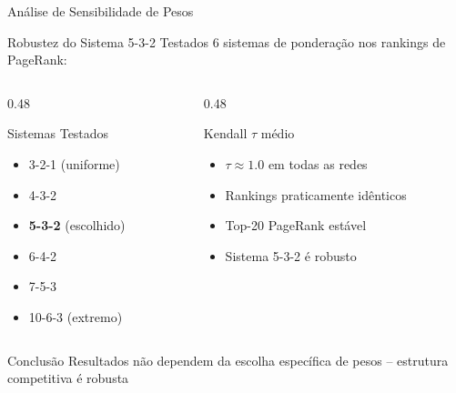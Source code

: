 \begin{frame}[shrink=5]{Análise de Sensibilidade de Pesos}
    \begin{block}{Robustez do Sistema 5-3-2}
        Testados 6 sistemas de ponderação nos rankings de PageRank:
    \end{block}

    \vspace{0.3cm}

    \begin{columns}[T]
        \begin{column}{0.48\textwidth}
            \begin{block}{Sistemas Testados}
                \footnotesize
                \begin{itemize}
                    \item 3-2-1 (uniforme)
                    \item 4-3-2
                    \item \textbf{5-3-2} (escolhido)
                    \item 6-4-2
                    \item 7-5-3
                    \item 10-6-3 (extremo)
                \end{itemize}
            \end{block}
        \end{column}
        \begin{column}{0.48\textwidth}
            \begin{block}{Kendall $\tau$ médio}
                \footnotesize
                \begin{itemize}
                    \item \textbf{$\tau \approx 1.0$} em todas as redes
                    \item Rankings praticamente idênticos
                    \item Top-20 PageRank estável
                    \item Sistema 5-3-2 é robusto
                \end{itemize}
            \end{block}
        \end{column}
    \end{columns}

    \vspace{0.15cm}

    \begin{alertblock}{Conclusão}
        \footnotesize
        \centering
        Resultados não dependem da escolha específica de pesos -- estrutura competitiva é robusta
    \end{alertblock}
\end{frame}
